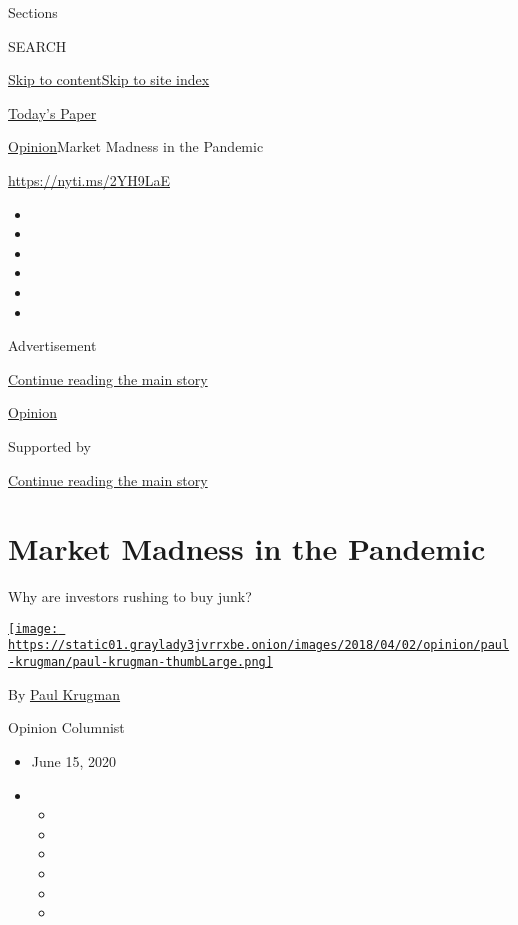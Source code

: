 Sections

SEARCH

\protect\hyperlink{site-content}{Skip to
content}\protect\hyperlink{site-index}{Skip to site index}

\href{https://myaccount.nytimes3xbfgragh.onion/auth/login?response_type=cookie\&client_id=vi}{}

\href{https://www.nytimes3xbfgragh.onion/section/todayspaper}{Today's
Paper}

\href{/section/opinion}{Opinion}\textbar{}Market Madness in the Pandemic

\url{https://nyti.ms/2YH9LaE}

\begin{itemize}
\item
\item
\item
\item
\item
\item
\end{itemize}

Advertisement

\protect\hyperlink{after-top}{Continue reading the main story}

\href{/section/opinion}{Opinion}

Supported by

\protect\hyperlink{after-sponsor}{Continue reading the main story}

\hypertarget{market-madness-in-the-pandemic}{%
\section{Market Madness in the
Pandemic}\label{market-madness-in-the-pandemic}}

Why are investors rushing to buy junk?

\href{https://www.nytimes3xbfgragh.onion/by/paul-krugman}{\texttt{[image: https://static01.graylady3jvrrxbe.onion/images/2018/04/02/opinion/paul-krugman/paul-krugman-thumbLarge.png]}}

By \href{https://www.nytimes3xbfgragh.onion/by/paul-krugman}{Paul
Krugman}

Opinion Columnist

\begin{itemize}
\item
  June 15, 2020
\item
  \begin{itemize}
  \item
  \item
  \item
  \item
  \item
  \item
  \end{itemize}
\end{itemize}

